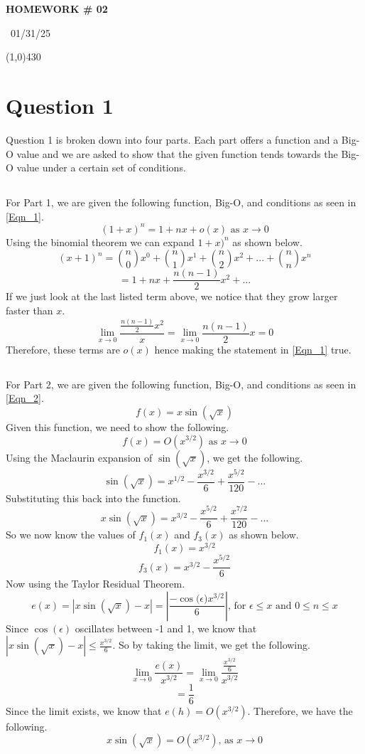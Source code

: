\documentclass{article}
\begin{document}
\begin{center}
 \LARGE\bfseries HOMEWORK \# 02
\end{center}
\begin{center}
    ~01/31/25~
\end{center}
 \line(1,0){430}

\section{Question 1}
Question 1 is broken down into four parts. Each part offers a function and a Big-O value and we are asked to show that the given function tends towards the Big-O value under a certain set of conditions.

\subsection{}
For Part 1, we are given the following function, Big-O, and conditions as seen in \ref{Eqn_1}.
\begin{equation}
    \label{Eqn_1}
    (1+x)^n = 1 +nx + o(x) \mbox{ as } x \rightarrow 0
\end{equation}
Using the binomial theorem we can expand \(1+x)^n\) as shown below.
\[
(x+1)^n = \binom{n}{0} x^0 + \binom{n}{1} x^1 + \binom{n}{2} x^2 + ... + \binom{n}{n} x^n
\]
\[
= 1 + nx + \frac{n(n-1)}{2}x^2+...
\]
If we just look at the last listed term above, we notice that they grow larger faster than \(x\). 
\[
\lim_{x \to 0}\frac{\frac{n(n-1)}{2}x^2}{x} = \lim_{x \to 0}\frac{n(n-1)}{2}x = 0
\]
Therefore, these terms are \(o(x)\) hence making the statement in \ref{Eqn_1} true.

\subsection{}
For Part 2, we are given the following function, Big-O, and conditions as seen in \ref{Eqn_2}.
\begin{equation}
    \label{Eqn_2}
    f(x) = x\sin{(\sqrt{x})}
\end{equation}
Given this function, we need to show the following.
\[
f(x) = O(x^{3/2}) \mbox{ as } x \rightarrow 0
\]
Using the Maclaurin expansion of \(\sin{(\sqrt{x})}\), we get the following.
\[
\sin{(\sqrt{x})} = x^{1/2} - \frac{x^{3/2}}{6} + \frac{x^{5/2}}{120} - ...
\]
Substituting this back into the function.
\[
x \sin{(\sqrt{x})} = x^{3/2} - \frac{x^{5/2}}{6} + \frac{x^{7/2}}{120} - ...
\]
So we now know the values of \(f_1(x)\) and \(f_3(x)\) as shown below.
\[
f_1(x) = x^{3/2}
\]
\[
f_3(x) = x^{3/2}-\frac{x^{5/2}}{6}
\]
Now using the Taylor Residual Theorem.
\[
e(x) = |x\sin{(\sqrt{x})} - x| = |\frac{-\cos{(\epsilon})x^{3/2}}{6}| \mbox{, for } \epsilon \leq x \mbox{ and } 0 \leq n \leq x
\]
Since \(\cos{(\epsilon)}\) oscillates between -1 and 1, we know that \(|x\sin{(\sqrt{x})} - x| \leq \frac{x^{3/2}}{6}\). So by taking the limit, we get the following.
\[
\lim_{x \to 0}\frac{e(x)}{x^{3/2}} = \lim_{x \to 0}\frac{\frac{x^{3/2}}{6}}{x^{3/2}}
\]
\[
= \frac{1}{6}
\]
Since the limit exists, we know that \(e(h) = O(x^{3/2})\). Therefore, we have the following.
\[
x \sin{(\sqrt{x})} = O(x^{3/2}) \mbox{, as } x \to 0
\]
\end{document}
